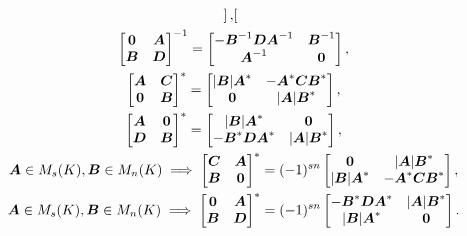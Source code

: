 \begin{gather*}
\begin{bmatrix}
	\end{bmatrix}, \\
	\begin{bmatrix}
		\vb0 & \vb{A} \\
		\vb{B} & \vb{D}
	\end{bmatrix}^{-1}
	= \begin{bmatrix}
		-\vb{B}^{-1}\vb{D}\vb{A}^{-1} & \vb{B}^{-1} \\
		\vb{A}^{-1} & \vb0
	\end{bmatrix}, \\
	\begin{bmatrix}
		\vb{A} & \vb{C} \\
		\vb0 & \vb{B}
	\end{bmatrix}^*
	= \begin{bmatrix}
		\abs{\vb{B}} \vb{A}^* & -\vb{A}^*\vb{C}\vb{B}^* \\
		\vb0 & \abs{\vb{A}} \vb{B}^*
	\end{bmatrix}, \\
	\begin{bmatrix}
		\vb{A} & \vb0 \\
		\vb{D} & \vb{B}
	\end{bmatrix}^*
	= \begin{bmatrix}
		\abs{\vb{B}} \vb{A}^* & \vb0 \\
		-\vb{B}^* \vb{D} \vb{A}^* & \abs{\vb{A}} \vb{B}^*
	\end{bmatrix}, \\
	\vb{A} \in M_s(K),
	\vb{B} \in M_n(K)
	\implies
	\begin{bmatrix}
		\vb{C} & \vb{A} \\
		\vb{B} & \vb0
	\end{bmatrix}^*
	= (-1)^{sn} \begin{bmatrix}
		\vb0 & \abs{\vb{A}} \vb{B}^* \\
		\abs{\vb{B}} \vb{A}^* & -\vb{A}^*\vb{C}\vb{B}^*
	\end{bmatrix}, \\
	\vb{A} \in M_s(K),
	\vb{B} \in M_n(K)
	\implies
	\begin{bmatrix}
		\vb0 & \vb{A} \\
		\vb{B} & \vb{D}
	\end{bmatrix}^*
	= (-1)^{sn} \begin{bmatrix}
		-\vb{B}^*\vb{D}\vb{A}^* & \abs{\vb{A}} \vb{B}^* \\
		\abs{\vb{B}} \vb{A}^* & \vb0
	\end{bmatrix}. \\

\end{gather*}
